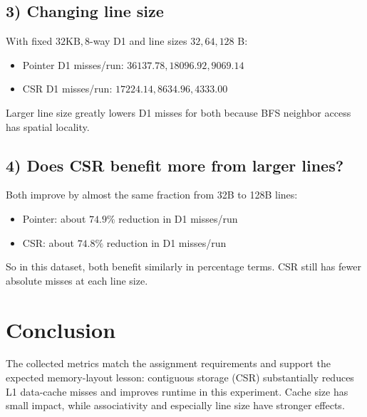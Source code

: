\documentclass[11pt]{article}
\begin{document}
\subsection*{3) Changing line size}
With fixed \(32\text{KB}, 8\)-way D1 and line sizes \(32,64,128\) B:
\begin{itemize}
\item Pointer D1 misses/run: \(36137.78, 18096.92, 9069.14\)
\item CSR D1 misses/run: \(17224.14, 8634.96, 4333.00\)
\end{itemize}
Larger line size greatly lowers D1 misses for both because BFS neighbor access has spatial locality.

\subsection*{4) Does CSR benefit more from larger lines?}
Both improve by almost the same fraction from 32B to 128B lines:
\begin{itemize}
\item Pointer: about \(74.9\%\) reduction in D1 misses/run
\item CSR: about \(74.8\%\) reduction in D1 misses/run
\end{itemize}
So in this dataset, both benefit similarly in percentage terms. CSR still has fewer absolute misses at each line size.

\section*{Conclusion}
The collected metrics match the assignment requirements and support the expected memory-layout lesson:
contiguous storage (CSR) substantially reduces L1 data-cache misses and improves runtime in this experiment.
Cache size has small impact, while associativity and especially line size have stronger effects.
\end{document}
